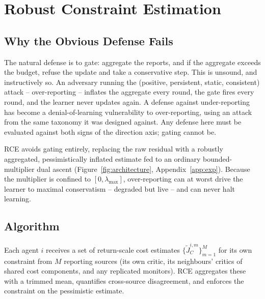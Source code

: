 \documentclass{article}
\begin{document}
\section{Robust Constraint Estimation}
\label{sec:defense}

\subsection{Why the Obvious Defense Fails}

The natural defense is to gate: aggregate the reports, and if the aggregate exceeds the budget, refuse the update and take a conservative step. This is unsound, and instructively so. An adversary running the (positive, persistent, static, consistent) attack -- over-reporting -- inflates the aggregate every round, the gate fires every round, and the learner never updates again. A defense against under-reporting has become a denial-of-learning vulnerability to over-reporting, using an attack from the same taxonomy it was designed against. Any defense here must be evaluated against both signs of the direction axis; gating cannot be.

RCE avoids gating entirely, replacing the raw residual with a robustly aggregated, pessimistically inflated estimate fed to an ordinary bounded-multiplier dual ascent (Figure~\ref{fig:architecture}, Appendix~\ref{app:exp}). Because the multiplier is confined to $[0,\lambda_{\max}]$, over-reporting can at worst drive the learner to maximal conservatism -- degraded but live -- and can never halt learning.

\subsection{Algorithm}

Each agent $i$ receives a set of return-scale cost estimates $\{\tilde{J}^{i,m}_C\}_{m=1}^{M}$ for its own constraint from $M$ reporting sources (its own critic, its neighbours' critics of shared cost components, and any replicated monitors). RCE aggregates these with a trimmed mean, quantifies cross-source disagreement, and enforces the constraint on the pessimistic estimate.
\end{document}
